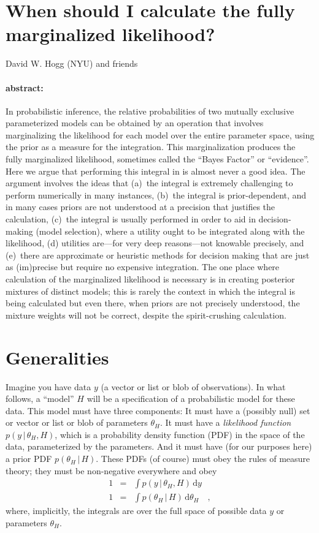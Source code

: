 \documentclass[12pt]{article}
\newcommand{\dd}{\mathrm{d}}
\newcommand{\given}{\,|\,}
\begin{document}
\section*{When should I calculate the fully marginalized likelihood?}

\noindent
David W. Hogg (NYU) and friends

\paragraph{abstract:}
In probabilistic inference, the relative probabilities of two mutually
exclusive parameterized models can be obtained by an operation that
involves marginalizing the likelihood for each model over the entire
parameter space, using the prior as a measure for the integration.
This marginalization produces the fully marginalized likelihood,
sometimes called the ``Bayes Factor'' or ``evidence''.  Here we argue
that performing this integral in is almost never a good idea.  The
argument involves the ideas that (a)~the integral is extremely
challenging to perform numerically in many instances, (b)~the integral
is prior-dependent, and in many cases priors are not
understood at a precision that justifies the calculation, (c)~the
integral is usually performed in order to aid in decision-making
(model selection), where a utility ought to be integrated along with
the likelihood, (d) utilities are---for very deep reasons---not knowable precisely, and
(e)~there are approximate or heuristic methods for decision making
that are just as (im)precise but require no expensive integration.
The one place where calculation of the marginalized likelihood is
necessary is in creating posterior mixtures of distinct models; this
is rarely the context in which the integral is being calculated but
even there, when priors are not precisely understood, the mixture
weights will not be correct, despite the spirit-crushing calculation.

\section{Generalities}

Imagine you have data $y$ (a vector or list or blob of observations).
In what follows, a ``model'' $H$ will be a specification of a probabilistic model for these data.
This model must have three components:
It must have a (possibly null) set or vector or list or blob of parameters $\theta_H$.
It must have a \emph{likelihood function} $p(y\given\theta_H,H)$, which is
  a probability density function (PDF) in the space of the data, parameterized by the parameters.
And it must have (for our purposes here) a prior PDF $p(\theta_H\given H)$.
These PDFs (of course) must obey the rules of measure theory;
  they must be non-negative everywhere and obey
\begin{eqnarray}
1 &=& \int p(y\given\theta_H,H)\,\dd y
\\
1 &=& \int p(\theta_H\given H)\,\dd \theta_H
\quad ,
\end{eqnarray}
where, implicitly,
the integrals are over the full space of possible data $y$ or parameters $\theta_H$.
\end{document}

